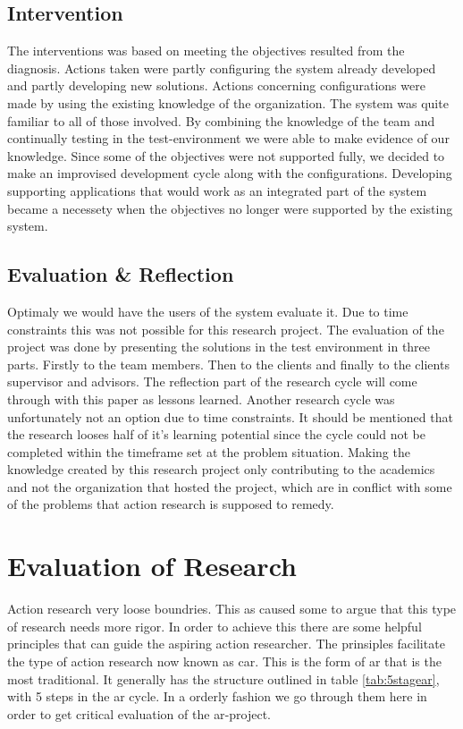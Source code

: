 \subsection{Intervention}
The interventions was based on meeting the objectives resulted from the diagnosis. 
Actions taken were partly configuring the system already developed and partly developing new solutions.
Actions concerning configurations were made by using the existing knowledge of the organization.
The system was quite familiar to all of those involved.
By combining the knowledge of the team and continually testing in the test-environment we were able to make evidence of our knowledge.
Since some of the objectives were not supported fully, we decided to make an improvised development cycle along with the configurations. 
Developing supporting applications that would work as an integrated part of the system became a necessety when the objectives no longer were supported by the existing system.
\subsection{Evaluation \& Reflection}
Optimaly we would have the users of the system evaluate it. 
Due to time constraints this was not possible for this research project. 
The evaluation of the project was done by presenting the solutions in the test environment in three parts.
Firstly to the team members. Then to the clients and finally to the clients supervisor and advisors.
The reflection part of the research cycle will come through with this paper as lessons learned.
Another research cycle was unfortunately not an option due to time constraints.
It should be mentioned that the research looses half of it's learning potential since the cycle could not be completed within the timeframe set at the problem situation. 
Making the knowledge created by this research project only contributing to the academics and not the organization that hosted the project, which are in conflict with some of the problems that action research is supposed to remedy.

\section{Evaluation of Research}
Action research very loose boundries. This as caused some to argue that this type of research needs more rigor. 
In order to achieve this there are some helpful principles that can guide the aspiring action researcher. 
The prinsiples facilitate the type of action research now known as \gls{car}.
This is the form of \gls{ar} that is the most traditional. 
It generally has the structure outlined in table \ref{tab:5stagear}, with 5 steps in the \gls{ar} cycle.
In a orderly fashion we go through them here in order to get critical evaluation of the \gls{ar}-project. 
